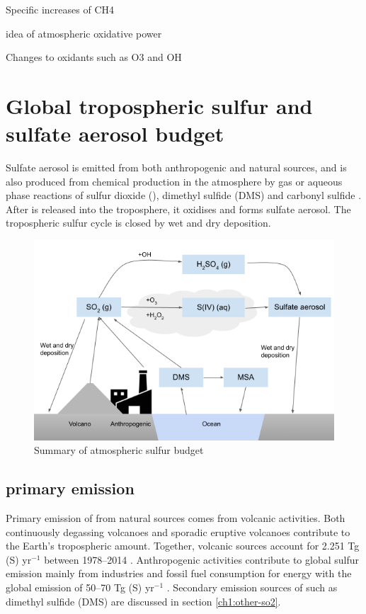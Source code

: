 Specific increases of CH4 

idea of atmospheric oxidative power

Changes to oxidants such as O3 and OH

\section{Global tropospheric sulfur and sulfate aerosol budget}

Sulfate aerosol is emitted from both anthropogenic and natural sources, and is also produced from chemical production in the atmosphere by gas or aqueous phase reactions of sulfur dioxide (), dimethyl sulfide (DMS) and carbonyl sulfide \citep[OCS;][]{belvisoAssessmentMarineBiota2000}. After  is released into the troposphere, it oxidises and forms sulfate aerosol.  The tropospheric sulfur cycle is closed by wet and dry deposition.

\begin{figure}
    \centering
    \includegraphics[width=6in]{Chapter1/figs/sulfur_budget.png}
    \caption[Summary of atmospheric sulfur budget]{Summary of atmospheric sulfur budget}
    \label{fig:sulfur-budget}
\end{figure}

\subsection{ primary emission}

Primary emission of  from natural sources comes from volcanic activities. Both continuously degassing volcanoes and sporadic eruptive volcanoes contribute to the Earth's tropospheric  amount. Together, volcanic sources account for 2.251  Tg (S) yr$^{-1}$ between 1978--2014 \citep{carnMultidecadalSatelliteMeasurements2016}. Anthropogenic activities contribute to global sulfur emission mainly from industries and fossil fuel consumption for energy with the global emission of 50--70 Tg (S) yr$^{-1}$ \citep{forsterEarthEnergyBudget2021}. Secondary emission sources of   such as dimethyl sulfide (DMS) are discussed in section \ref{ch1:other-so2}.

